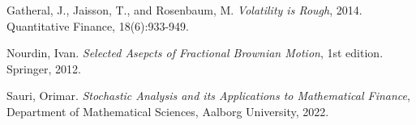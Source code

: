 \documentclass[11pt,a4paper,twoside,openright,english]{book}
\begin{document}
\frontmatter





\mainmatter

%









% 
% 

%

\backmatter


%
%
\begin{thebibliography}{}
Gatheral, J., Jaisson, T., and Rosenbaum, M. \textit{Volatility is Rough}, 2014. Quantitative Finance, 18(6):933-949.

Nourdin, Ivan. \textit{Selected Asepcts of Fractional Brownian Motion}, 1st edition. Springer, 2012.

Sauri, Orimar. \textit{Stochastic Analysis and its Applications to Mathematical Finance}, Department of Mathematical Sciences, Aalborg University, 2022.
\end{thebibliography}{}
\end{document}
